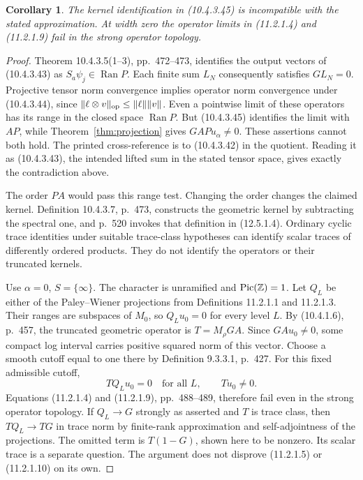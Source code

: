 \documentclass[11pt,reqno]{amsart}
\newtheorem{corollary}[theorem]{Corollary}
\numberwithin{equation}{section}
\begin{document}
\begin{corollary}
The kernel identification in (10.4.3.45) is incompatible with the stated approximation. At width zero the operator limits in (11.2.1.4) and (11.2.1.9) fail in the strong operator topology.
\end{corollary}
\begin{proof}

Theorem 10.4.3.5(1--3), pp.~472--473, identifies the output vectors of (10.4.3.43) as \(S_a\psi_j\in\operatorname{Ran}P\). Each finite sum \(L_N\) consequently satisfies \(G L_N=0\). Projective tensor norm convergence implies operator norm convergence under (10.4.3.44), since \(\|\ell\otimes v\|_{\rm op}\le\|\ell\|\|v\|\). Even a pointwise limit of these operators has its range in the closed space \(\operatorname{Ran}P\). But (10.4.3.45) identifies the limit with \(AP\), while Theorem~\ref{thm:projection} gives \(GAPu_\alpha\ne0\). These assertions cannot both hold. The printed cross-reference is to (10.4.3.42) in the quotient. Reading it as (10.4.3.43), the intended lifted sum in the stated tensor space, gives exactly the contradiction above.

The order \(PA\) would pass this range test. Changing the order changes the claimed kernel. Definition 10.4.3.7, p.~473, constructs the geometric kernel by subtracting the spectral one, and p.~520 invokes that definition in (12.5.1.4). Ordinary cyclic trace identities under suitable trace-class hypotheses can identify scalar traces of differently ordered products. They do not identify the operators or their truncated kernels.
\par\smallskip
Use \(\alpha=0\), \(S=\{\infty\}\). The character is unramified and \(\operatorname{Pic}(\mathbb Z)=1\). Let \(Q_L\) be either of the Paley--Wiener projections from Definitions 11.2.1.1 and 11.2.1.3. Their ranges are subspaces of \(M_0\), so \(Q_Lu_0=0\) for every level \(L\). By (10.4.1.6), p.~457, the truncated geometric operator is \(T=M_\rho GA\). Since \(GAu_0\ne0\), some compact log interval carries positive squared norm of this vector. Choose a smooth cutoff equal to one there by Definition 9.3.3.1, p.~427. For this fixed admissible cutoff,
\[
                  TQ_Lu_0=0\quad\text{for all }L,\qquad Tu_0\ne0 .
\]
Equations (11.2.1.4) and (11.2.1.9), pp.~488--489, therefore fail even in the strong operator topology. If \(Q_L\to G\) strongly as asserted and \(T\) is trace class, then \(TQ_L\to TG\) in trace norm by finite-rank approximation and self-adjointness of the projections. The omitted term is \(T(1-G)\), shown here to be nonzero. Its scalar trace is a separate question. The argument does not disprove (11.2.1.5) or (11.2.1.10) on its own.
\end{proof}
\end{document}
